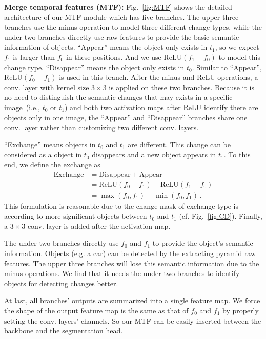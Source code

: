 \documentclass[review]{elsarticle}
\begin{document}
\textbf{Merge temporal features (MTF):} Fig.~\ref{fig:MTF} shows the detailed architecture of our MTF module which has five branches. The upper three branches use the minus operation to model three different change types, while the under two branches directly use raw features to provide the basic semantic information of objects. ``Appear'' means the object only exists in $t_1$, so we expect $f_1$ is larger than $f_0$ in these positions. And we use $\text{ReLU}(f_1 - f_0)$ to model this change type. ``Disappear'' means the object only exists in $t_0$. Similar to ``Appear'', $\text{ReLU}(f_0 - f_1)$ is used in this branch. After the minus and ReLU operations, a conv. layer with kernel size $3\times 3$ is applied on these two branches. Because it is no need to distinguish the semantic changes that may exists in a specific image~(i.e., $t_0$ or $t_1$) and both two activation maps after ReLU identify there are objects only in one image, the ``Appear'' and ``Disappear'' branches share one conv. layer rather than customizing two different conv. layers.

``Exchange'' means objects in $t_0$ and $t_1$ are different. This change can be considered as a object in $t_0$ disappears and a new object appears in $t_1$. To this end, we define the exchange as
\begin{align}
  \label{eq:exchange}
  \text{Exchange} &= \text{Disappear} + \text{Appear} \\
  &= \text{ReLU}(f_0 - f_1) + \text{ReLU}(f_1 - f_0) \\
  &= \max(f_0, f_1) - \min(f_0, f_1)\,.
\end{align}
This formulation is reasonable due to the change mask of exchange type is according to more significant objects between $t_0$ and $t_1$ (cf. Fig.~\ref{fig:CD}). Finally, a $3 \times 3$ conv. layer is added after the activation map. 

The under two branches directly use $f_0$ and $f_1$ to provide the object's semantic information. Objects (e.g. a car) can be detected by the extracting pyramid raw features. The upper three branches will lose this semantic information due to the minus operations. We find that it needs the under two branches to identify objects for detecting changes better.

At last, all branches' outputs are summarized into a single feature map. We force the shape of the output feature map is the same as that of $f_0$ and $f_1$ by properly setting the conv. layers' channels. So our MTF can be easily inserted between the backbone and the segmentation head.
\end{document}
